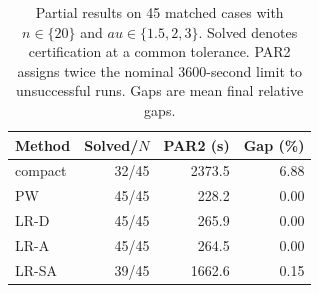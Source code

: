 \begin{table}[t]
\centering
\begin{tabular}{lrrr}
\hline
Method & Solved/$N$ & PAR2 (s) & Gap (\%) \\
\hline
compact & 32/45 & 2373.5 & 6.88 \\
PW & 45/45 & 228.2 & 0.00 \\
LR-D & 45/45 & 265.9 & 0.00 \\
LR-A & 45/45 & 264.5 & 0.00 \\
LR-SA & 39/45 & 1662.6 & 0.15 \\
\hline
\end{tabular}
\caption{Partial results on 45 matched cases with $n\in\{20\}$ and $	au\in\{1.5,2,3\}$. Solved denotes certification at a common tolerance. PAR2 assigns twice the nominal 3600-second limit to unsuccessful runs. Gaps are mean final relative gaps.}
\label{tab:projector-summary}
\end{table}
